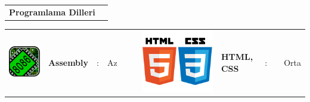 \documentclass[paper=a4,fontsize=11pt]{temp} %
\begin{document}
\hspace{3mm}
\begin{minipage}[t]{0.33\textwidth} 

\begin{tabular}[t]{ l l }
\textbf{Programlama Dilleri}
\end{tabular}

\sepspace

\end{minipage}
%
\begin{minipage}[t]{0.66\textwidth} 



\begin{tabular}{lllllllllll}
\includegraphics[scale=0.035]{IMG/languages/assembly} & \textbf{Assembly} & : & Az  &  &  & \includegraphics[scale=0.03]{IMG/languages/htmlCss} & \textbf{HTML, CSS}  & : &  & Orta   \\

\end{tabular}
\end{minipage}
\end{document}
